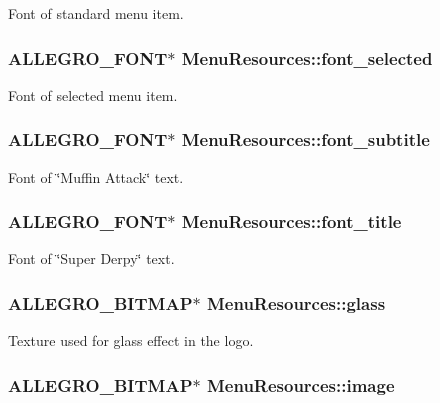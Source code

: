 Font of standard menu item. \hypertarget{structMenuResources_af0e2a49f0013d401f16ca00143ef75d1}{
\subsubsection[{font\+\_\+selected}]{\setlength{\rightskip}{0pt plus 5cm}A\+L\+L\+E\+G\+R\+O\+\_\+\+F\+O\+N\+T$\ast$ Menu\+Resources\+::font\+\_\+selected}}\label{structMenuResources_af0e2a49f0013d401f16ca00143ef75d1}
Font of selected menu item. \hypertarget{structMenuResources_ae2c5efc61c728e78e711b98d4439597d}{
\subsubsection[{font\+\_\+subtitle}]{\setlength{\rightskip}{0pt plus 5cm}A\+L\+L\+E\+G\+R\+O\+\_\+\+F\+O\+N\+T$\ast$ Menu\+Resources\+::font\+\_\+subtitle}}\label{structMenuResources_ae2c5efc61c728e78e711b98d4439597d}
Font of \char`\"{}\+Muffin Attack\char`\"{} text. \hypertarget{structMenuResources_aab27cf02d971e4c9c9f2c4398357dc3a}{
\subsubsection[{font\+\_\+title}]{\setlength{\rightskip}{0pt plus 5cm}A\+L\+L\+E\+G\+R\+O\+\_\+\+F\+O\+N\+T$\ast$ Menu\+Resources\+::font\+\_\+title}}\label{structMenuResources_aab27cf02d971e4c9c9f2c4398357dc3a}
Font of \char`\"{}\+Super Derpy\char`\"{} text. \hypertarget{structMenuResources_a46790a4783f1ab503b94de8e0d1ee587}{
\subsubsection[{glass}]{\setlength{\rightskip}{0pt plus 5cm}A\+L\+L\+E\+G\+R\+O\+\_\+\+B\+I\+T\+M\+A\+P$\ast$ Menu\+Resources\+::glass}}\label{structMenuResources_a46790a4783f1ab503b94de8e0d1ee587}
Texture used for glass effect in the logo. \hypertarget{structMenuResources_a81135b3d5918d1e4e44e4cdaf48e9a5e}{
\subsubsection[{image}]{\setlength{\rightskip}{0pt plus 5cm}A\+L\+L\+E\+G\+R\+O\+\_\+\+B\+I\+T\+M\+A\+P$\ast$ Menu\+Resources\+::image}}\label{structMenuResources_a81135b3d5918d1e4e44e4cdaf48e9a5e}
